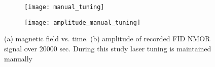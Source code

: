 \documentclass[12pt]{report}
\begin{document}
   \begin{figure}
    \centering
 
    \begin{subfigure}[b]{0.45\textwidth}
        \centering
        \texttt{[image: manual\_tuning]}
        \caption{}
        \label{fig:three sin x}
    \end{subfigure}
    \hfill
    \begin{subfigure}[b]{0.45\textwidth}
        \centering
        \texttt{[image: amplitude\_manual\_tuning]}
        \caption{}
        \label{fig:five over x}
    \end{subfigure}
    \caption{(a) magnetic field vs. time. (b) amplitude of recorded FID NMOR signal over 20000 sec. During this study laser tuning is maintained manually}
    \label{fig:three graphs}
\end{figure}
\end{document}
